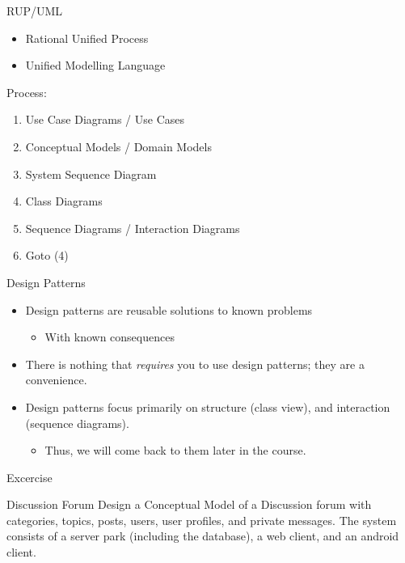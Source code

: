 \documentclass[10pt,t,a4paper]{beamer}
\begin{document}
\begin{frame}[label=sec-14]{RUP/UML}
\begin{itemize}
\item Rational Unified Process
\item Unified Modelling Language
\end{itemize}

Process:
\begin{enumerate}
\item Use Case Diagrams / Use Cases
\item Conceptual Models / Domain Models
\item System Sequence Diagram
\item Class Diagrams
\item Sequence Diagrams / Interaction Diagrams
\item Goto (4)
\end{enumerate}
\end{frame}
\begin{frame}[label=sec-15]{Design Patterns}
\begin{itemize}
\item Design patterns are reusable solutions to known problems
\begin{itemize}
\item With known consequences
\end{itemize}
\item There is nothing that \emph{requires} you to use design patterns; they are a convenience.
\item Design patterns focus primarily on structure (class view), and interaction (sequence diagrams).
\begin{itemize}
\item Thus, we will come back to them later in the course.
\end{itemize}
\end{itemize}
\end{frame}
\begin{frame}[label=sec-16]{Excercise}
\begin{block}{Discussion Forum}
Design a Conceptual Model of a Discussion forum with categories, topics, posts, users, user profiles, and private messages.
The system consists of a server park (including the database), a web client, and an android client.
\end{block}
\end{frame}
\end{document}
